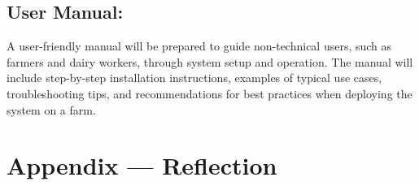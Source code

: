 \documentclass{article}
\begin{document}
    \subsection{User Manual:}
        A user-friendly manual will be prepared to guide non-technical users, such as farmers 
        and dairy workers, through system setup and operation. The manual will include step-by-step installation 
        instructions, examples of typical use cases, troubleshooting tips, and recommendations for best practices 
        when deploying the system on a farm.





\newpage{}

\section*{Appendix --- Reflection}



\end{document}
